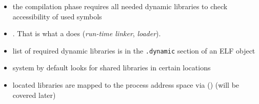 

\begin{slide}

\begin{itemize}
\item the compilation phase requires all needed dynamic libraries to check
accessibility of used symbols
\item {}. That is what a  does  (\emph{run-time
linker}, \emph{loader}).
\item list of required dynamic libraries is in the \texttt{.dynamic} section of
an ELF object
\item system by default looks for shared libraries in certain locations
\item located libraries are mapped to the process address space via
() (will be covered later)
\end{itemize}
\end{slide}


